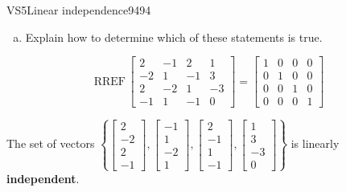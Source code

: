 \begin{exercise}{VS5}{Linear independence}{9494}
\begin{exerciseStatement}
\begin{enumerate}[(a)]
\begin{itemize}
 
\end{itemize}

     
\item  

 Explain how to determine which of these statements is true. 

 
\end{enumerate}

     \end{exerciseStatement}
 \begin{exerciseAnswer} 

 \[
\mathrm{RREF}\, \left[\begin{array}{cccc}
2 & -1 & 2 & 1 \\
-2 & 1 & -1 & 3 \\
2 & -2 & 1 & -3 \\
-1 & 1 & -1 & 0
\end{array}\right] = \left[\begin{array}{cccc}
1 & 0 & 0 & 0 \\
0 & 1 & 0 & 0 \\
0 & 0 & 1 & 0 \\
0 & 0 & 0 & 1
\end{array}\right]
            \] 

 

 The set of vectors \(\left\{ \left[\begin{array}{c}
2 \\
-2 \\
2 \\
-1
\end{array}\right] , \left[\begin{array}{c}
-1 \\
1 \\
-2 \\
1
\end{array}\right] , \left[\begin{array}{c}
2 \\
-1 \\
1 \\
-1
\end{array}\right] , \left[\begin{array}{c}
1 \\
3 \\
-3 \\
0
\end{array}\right] \right\}\) is linearly \textbf{independent}. 

 \end{exerciseAnswer}
 \end{exercise}


